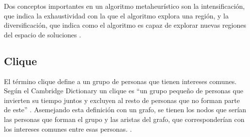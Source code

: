 
Dos conceptos importantes en un algoritmo metaheurístico son la intensificación, que indica la exhaustividad con la que el algoritmo explora una región, y la diversificación, que indica como el algoritmo es capaz de explorar nuevas regiones del espacio de soluciones \cite{libro-metaheuristicas}.

\subsection{Clique}
\label{sec-clique}
El término clique define a un grupo de personas que tienen intereses comunes. Según el Cambridge Dictionary un clique es ``un grupo pequeño de personas que invierten su tiempo juntos y excluyen al resto de personas que no forman parte de este''  \cite{cliqueCambridge}. Asemejando esta definición con un grafo, se tienen los nodos que serían las personas que forman el grupo y las aristas del grafo, que corresponderían con los intereses comunes entre esas personas. \cite{LUCE:1949}.

